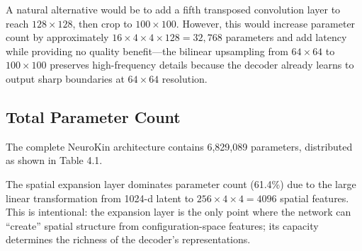 \documentclass[12pt,a4paper,oneside]{report}
\begin{document}
A natural alternative would be to add a fifth transposed convolution layer to reach $128 \times 128$, then crop to $100 \times 100$. However, this would increase parameter count by approximately $16 \times 4 \times 4 \times 128 = 32,768$ parameters and add latency while providing no quality benefit---the bilinear upsampling from $64 \times 64$ to $100 \times 100$ preserves high-frequency details because the decoder already learns to output sharp boundaries at $64 \times 64$ resolution.

\subsection{Total Parameter Count}

The complete NeuroKin architecture contains 6,829,089 parameters, distributed as shown in Table 4.1.

\begin{table}[H]
\centering
\caption{NeuroKin parameter distribution by component.}
\label{tab:neurokin_params}
\end{table}

The spatial expansion layer dominates parameter count (61.4\%) due to the large linear transformation from 1024-d latent to $256 \times 4 \times 4 = 4096$ spatial features. This is intentional: the expansion layer is the only point where the network can ``create'' spatial structure from configuration-space features; its capacity determines the richness of the decoder's representations.
\end{document}
